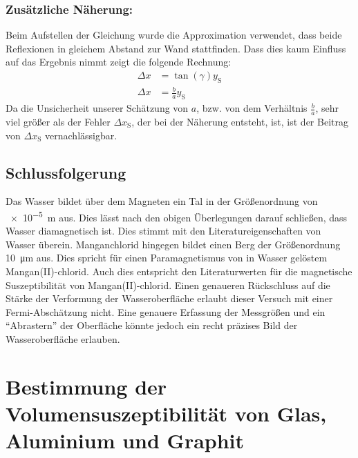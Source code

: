 \documentclass[
	a4paper,
	12pt,
	pagesize,
	ngerman
]{scrartcl}
\begin{document}
	\subsubsection*{Zusätzliche Näherung:}
	Beim Aufstellen der Gleichung wurde die Approximation verwendet, dass beide Reflexionen in gleichem Abstand zur Wand stattfinden. Dass dies kaum Einfluss auf das Ergebnis nimmt zeigt die folgende Rechnung: %
	\begin{align}
		\Delta x &= \tan (\gamma) y_\text{S} \\
		\Delta x &= \frac{b}{a} y_\text{S}
	\end{align}
	Da die Unsicherheit unserer Schätzung von $a$, bzw. von dem Verhältnis $\frac{b}{a}$, sehr viel größer als der Fehler $\Delta x_\text{S}$, der bei der Näherung entsteht, ist, ist der Beitrag von $\Delta x_\text{S}$ vernachlässigbar.

	\subsection{Schlussfolgerung}
	Das Wasser bildet über dem Magneten ein Tal in der Größenordnung von \SI{e-5}{m} aus. Dies lässt nach den obigen Überlegungen darauf schließen, dass Wasser diamagnetisch ist. Dies stimmt mit den Literatureigenschaften von Wasser überein.
	Manganchlorid hingegen bildet einen Berg der Größenordnung \SI{10}{\micro \meter} aus. Dies spricht für einen Paramagnetismus von in Wasser gelöstem Mangan(II)-chlorid. Auch dies entspricht den Literaturwerten für die magnetische Suszeptibilität von Mangan(II)-chlorid. Einen genaueren Rückschluss auf die Stärke der Verformung der Wasseroberfläche erlaubt dieser Versuch mit einer Fermi-Abschätzung nicht. Eine genauere Erfassung der Messgrößen und ein \enquote{Abrastern} der Oberfläche könnte jedoch ein recht präzises Bild der Wasseroberfläche erlauben. %
	
	\section{Bestimmung der Volumensuszeptibilität von Glas, Aluminium und Graphit}
\end{document}
